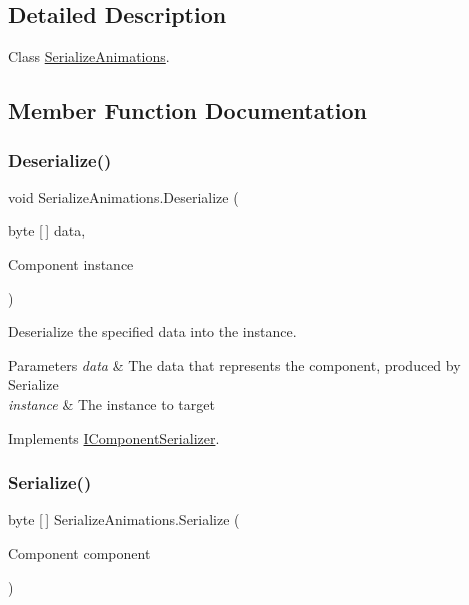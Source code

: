 \subsection{Detailed Description}
Class \hyperlink{class_serialize_animations}{Serialize\+Animations}. 



\subsection{Member Function Documentation}
\mbox{\label{class_serialize_animations_a70a93ea3a6ce6289e19f0552565cebba}} 
\subsubsection{\texorpdfstring{Deserialize()}{Deserialize()}}
{\footnotesize\ttfamily void Serialize\+Animations.\+Deserialize (\begin{DoxyParamCaption}\item[{byte \mbox{[}$\,$\mbox{]}}]{data,  }\item[{Component}]{instance }\end{DoxyParamCaption})\hspace{0.3cm}{\ttfamily [inline]}}



Deserialize the specified data into the instance. 


\begin{DoxyParams}{Parameters}
{\em data} & The data that represents the component, produced by Serialize\\
\hline
{\em instance} & The instance to target\\
\hline
\end{DoxyParams}


Implements \hyperlink{interface_i_component_serializer_a4cc366a5c78b33d47a90c209d8fed883}{I\+Component\+Serializer}.

\mbox{\label{class_serialize_animations_a05552bb8c8baad409516f661845bc4e7}} 
\subsubsection{\texorpdfstring{Serialize()}{Serialize()}}
{\footnotesize\ttfamily byte \mbox{[}$\,$\mbox{]} Serialize\+Animations.\+Serialize (\begin{DoxyParamCaption}\item[{Component}]{component }\end{DoxyParamCaption})\hspace{0.3cm}{\ttfamily [inline]}}



